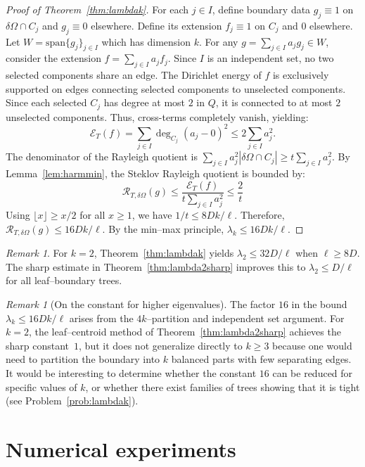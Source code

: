 \documentclass[11pt]{article}
\theoremstyle{definition}
\theoremstyle{remark}
\newtheorem{remark}[theorem]{Remark}
\newcommand{\dO}{\delta\Omega}
\begin{document}
\begin{proof}[Proof of Theorem~\ref{thm:lambdak}]
For each $j\in I$, define boundary data $g_j\equiv 1$ on $\dO\cap C_j$ and $g_j\equiv 0$ elsewhere. Define its extension $f_j \equiv 1$ on $C_j$ and $0$ elsewhere. Let $W=\mathrm{span}\{g_j\}_{j\in I}$ which has dimension $k$. For any  $g=\sum_{j\in I} a_j g_j \in W$, consider the extension $f=\sum_{j\in I} a_j f_j$. Since $I$ is an independent set, no two selected components share an edge. The Dirichlet energy of $f$ is exclusively supported on edges connecting selected components to unselected components. Since each selected $C_j$ has degree at most $2$ in $Q$, it is connected to at most $2$ unselected components. Thus, cross-terms completely vanish, yielding:
$$\mathcal{E}_T(f)=\sum_{j\in I}\deg_{C_j}(a_j-0)^2\le 2\sum_{j\in I}a_j^2.$$
The denominator of the Rayleigh quotient is $\sum_{j\in I} a_j^2 |\dO\cap C_j| \ge t \sum_{j\in I} a_j^2$. By Lemma~\ref{lem:harmmin}, the Steklov Rayleigh quotient is bounded by:
$$\mathcal{R}_{T,\dO}(g)\le \frac{\mathcal{E}_T(f)}{t\sum_{j\in I} a_j^2}\le\frac{2}{t}$$
Using $\lfloor x \rfloor \ge x/2$ for all $x \ge 1$, we have $1/t \le 8Dk/\ell$. Therefore, $\mathcal{R}_{T,\dO}(g) \le 16Dk/\ell$. By the min--max principle, $\lambda_k \le 16Dk/\ell$.
\end{proof}

\begin{remark}\label{rem:lambdak_vs_lambda2}
For $k=2$, Theorem~\ref{thm:lambdak} yields $\lambda_2\le 32D/\ell$ when $\ell\ge 8D$.
The sharp estimate in Theorem~\ref{thm:lambda2sharp} improves this to $\lambda_2\le D/\ell$ for all leaf--boundary trees.
\end{remark}

\begin{remark}[On the constant for higher eigenvalues]\label{rem:lambdak_sharp}
The factor $16$ in the bound $\lambda_k\le 16Dk/\ell$ arises from the $4k$--partition and independent set argument.
For $k=2$, the leaf--centroid method of Theorem~\ref{thm:lambda2sharp} achieves the sharp constant~$1$, but it does not generalize directly to $k\ge 3$ because one would need to partition the boundary into $k$ balanced parts with few separating edges.
It would be interesting to determine whether the constant $16$ can be reduced for specific values of $k$, or whether there exist families of trees showing that it is tight (see Problem~\ref{prob:lambdak}).
\end{remark}


\section{Numerical experiments}\label{sec:numerics}
\end{document}
